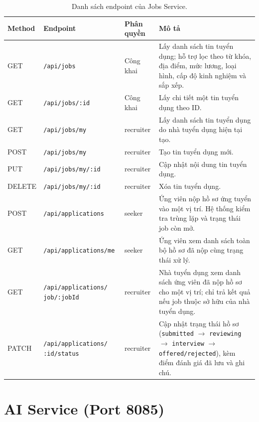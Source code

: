 \documentclass[../DoAn.tex]{subfiles}
\begin{document}
\begin{table}[H]
\centering
\caption{Danh sách endpoint của Jobs Service.}
\label{tab:api-jobs}
\small
\begin{tabular}{|p{1.3cm}|p{5.5cm}|p{2.4cm}|p{4.5cm}|}
\hline
\textbf{Method} & \textbf{Endpoint} & \textbf{Phân quyền} & \textbf{Mô tả} \\ \hline
GET    & \texttt{/api/jobs} & Công khai & Lấy danh sách tin tuyển dụng; hỗ trợ lọc theo từ khóa, địa điểm, mức lương, loại hình, cấp độ kinh nghiệm và sắp xếp. \\ \hline
GET    & \texttt{/api/jobs/:id} & Công khai & Lấy chi tiết một tin tuyển dụng theo ID. \\ \hline
GET    & \texttt{/api/jobs/my} & recruiter & Lấy danh sách tin tuyển dụng do nhà tuyển dụng hiện tại tạo. \\ \hline
POST   & \texttt{/api/jobs/my} & recruiter & Tạo tin tuyển dụng mới. \\ \hline
PUT    & \texttt{/api/jobs/my/:id} & recruiter & Cập nhật nội dung tin tuyển dụng. \\ \hline
DELETE & \texttt{/api/jobs/my/:id} & recruiter & Xóa tin tuyển dụng. \\ \hline
POST   & \texttt{/api/applications} & seeker & Ứng viên nộp hồ sơ ứng tuyển vào một vị trí. Hệ thống kiểm tra trùng lặp và trạng thái job còn mở. \\ \hline
GET    & \texttt{/api/applications/me} & seeker & Ứng viên xem danh sách toàn bộ hồ sơ đã nộp cùng trạng thái xử lý. \\ \hline
GET    & \texttt{/api/applications/} \newline \texttt{job/:jobId} & recruiter & Nhà tuyển dụng xem danh sách ứng viên đã nộp hồ sơ cho một vị trí; chỉ trả kết quả nếu job thuộc sở hữu của nhà tuyển dụng. \\ \hline
PATCH  & \texttt{/api/applications/} \newline \texttt{:id/status} & recruiter & Cập nhật trạng thái hồ sơ (\texttt{submitted} $\to$ \texttt{reviewing} $\to$ \texttt{interview} $\to$ \texttt{offered/rejected}), kèm điểm đánh giá đã lưu và ghi chú. \\ \hline
\end{tabular}
\end{table}

\section{AI Service (Port 8085)}
\end{document}
